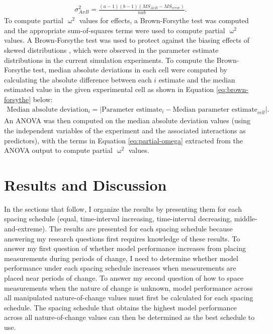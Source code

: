 \documentclass[
12pt, %
twoside,
english]{guelphthesis}
\begin{document}
\begin{align}
 \sigma^2_{A x B} = \frac{(a - 1)(b-1)(MS_{AxB} - MS_{error})}{nab}. 
\label{eq:var-interac}
\end{align}
To compute partial \(\upomega^2\) values for effects, a Brown-Forsythe test was computed and the appropriate sum-of-squares terms were used to compute partial \(\upomega^2\) values. A Brown-Forsythe test was used to protect against the biasing effects of skewed distributions \autocite{brown1974}, which were observed in the parameter estimate distributions in the current simulation experiments. To compute the Brown-Forsythe test, median absolute deviations in each cell were computed by calculating the absolute difference between each \(i\) estimate and the median estimated value in the given experimental cell as shown in Equation \ref{eq:brown-forsythe} below:
\begin{align}
\text{Median absolute deviation}_i = \lvert \text{Parameter estimate}_i - \text{Median parameter estimate}_{cell} \rvert.
\label{eq:brown-forsythe}
\end{align}
\noindent An ANOVA was then computed on the median absolute deviation values (using the independent variables of the experiment and the associated interactions as predictors), with the terms in Equation \ref{eq:partial-omega} extracted from the ANOVA output to compute partial \(\upomega^2\) values.

\hypertarget{results-and-discussion}{%
\section{Results and Discussion}\label{results-and-discussion}}

In the sections that follow, I organize the results by presenting them for each spacing schedule (equal, time-interval increasing, time-interval decreasing, middle-and-extreme). The results are presented for each spacing schedule because answering my research questions first requires knowledge of these results. To answer my first question of whether model performance increases from placing measurements during periods of change, I need to determine whether model performance under each spacing schedule increases when measurements are placed near periods of change. To answer my second question of how to space measurements when the nature of change is unknown, model performance across all manipulated nature-of-change values must first be calculated for each spacing schedule. The spacing schedule that obtains the highest model performance across all nature-of-change values can then be determined as the best schedule to use.
\end{document}
